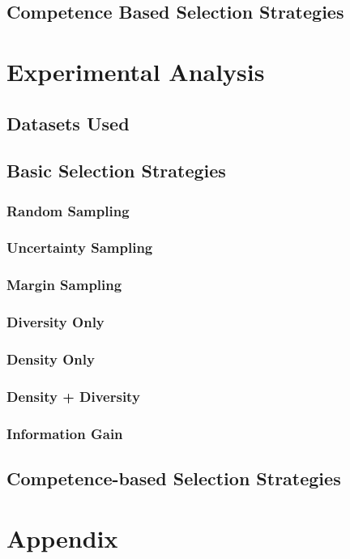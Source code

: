 \documentclass[a4paper,11pt]{report}
\begin{document}
\section{Competence Based Selection Strategies}
\chapter{Experimental Analysis}
\section{Datasets Used}
\section{Basic Selection Strategies}
\subsection{Random Sampling}
\subsection{Uncertainty Sampling}
\subsection{Margin Sampling}
\subsection{Diversity Only}
\subsection{Density Only}
\subsection{Density + Diversity}
\subsection{Information Gain}

\section{Competence-based Selection Strategies}


\chapter{Appendix}
\end{document}
